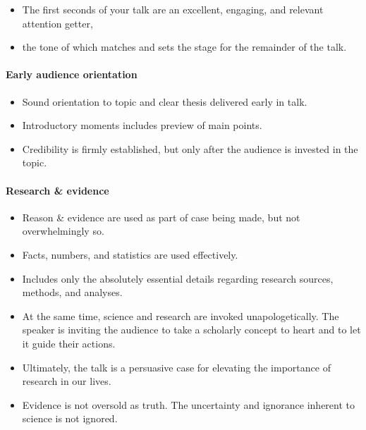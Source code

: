 \documentclass[
]{book}
\providecommand{\tightlist}{%
  \setlength{\itemsep}{0pt}\setlength{\parskip}{0pt}}
\begin{document}
\begin{itemize}
\tightlist
\item
  The first seconds of your talk are an excellent, engaging, and relevant attention getter,\\
\item
  the tone of which matches and sets the stage for the remainder of the talk.
\end{itemize}

\hypertarget{early-audience-orientation}{%
\paragraph{Early audience orientation}\label{early-audience-orientation}}

\begin{itemize}
\tightlist
\item
  Sound orientation to topic and clear thesis delivered early in talk.\\
\item
  Introductory moments includes preview of main points.\\
\item
  Credibility is firmly established, but only after the audience is invested in the topic.
\end{itemize}

\hypertarget{research-evidence}{%
\paragraph{Research \& evidence}\label{research-evidence}}

\begin{itemize}
\tightlist
\item
  Reason \& evidence are used as part of case being made, but not overwhelmingly so.\\
\item
  Facts, numbers, and statistics are used effectively.\\
\item
  Includes only the absolutely essential details regarding research sources, methods, and analyses.\\
\item
  At the same time, science and research are invoked unapologetically. The speaker is inviting the
  audience to take a scholarly concept to heart and to let it guide their actions.\\
\item
  Ultimately, the talk is a persuasive case for elevating the importance of research in our lives.\\
\item
  Evidence is not oversold as truth. The uncertainty and ignorance inherent to science is not ignored.
\end{itemize}
\end{document}
